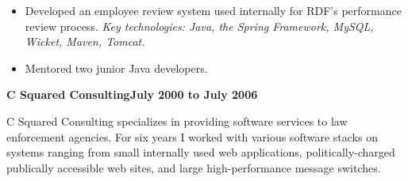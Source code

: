 \documentclass[a4paper,12pt]{article}
\newcommand{\jobheld}[2]{\textbf{#1\hfill #2}\nopagebreak}
\newcommand{\clientwork}[2]{\emph{#1\hfill #2}\nopagebreak}
\begin{document}

\begin{itemize}
\item Developed an employee review system used internally for RDF's performance review process.  \emph{Key technologies: Java, the Spring Framework, MySQL, Wicket, Maven, Tomcat.}

\item Mentored two junior Java developers.

\end{itemize}

\jobheld{C Squared Consulting}{July 2000 to July 2006}

C Squared Consulting specializes in providing software services to law enforcement agencies.  For six years I worked with various software stacks on systems ranging from small internally used web applications, politically-charged publically accessible web sites, and large high-performance message switches.
\end{document}

